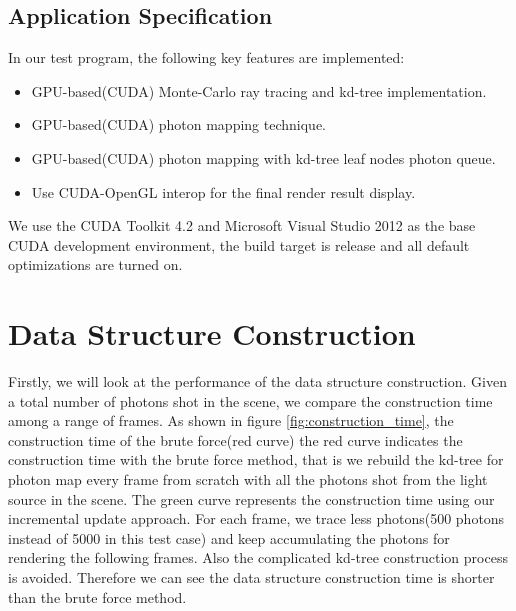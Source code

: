 \subsection{Application Specification}

In our test program, the following key features are implemented:

\begin{itemize}

\item{GPU-based(CUDA) Monte-Carlo ray tracing and kd-tree implementation.}

\item{GPU-based(CUDA) photon mapping technique. }

\item{GPU-based(CUDA) photon mapping with kd-tree leaf nodes photon queue.}

\item{Use CUDA-OpenGL interop for the final render result display. }

\end{itemize}

We use the CUDA Toolkit 4.2 and Microsoft Visual Studio 2012 as the base CUDA development environment, the build target is release and all default optimizations are turned on.


\section{Data Structure Construction}
\label{sec:build_time}

Firstly, we will look at the performance of the data structure construction. Given a total number of photons shot in the scene, we compare the construction time among a range of frames. As shown in figure \ref{fig:construction_time}, the construction time of the brute force(red curve)  the red curve indicates the construction time with the brute force method, that is we rebuild the kd-tree for photon map every frame from scratch with all the photons shot from the light source in the scene. The green curve represents the construction time using our incremental update approach. For each frame, we trace less photons(500 photons instead of 5000 in this test case) and keep accumulating the photons for rendering the following frames. Also the complicated kd-tree construction process is avoided. Therefore we can see the data structure construction time is shorter than the brute force method.

